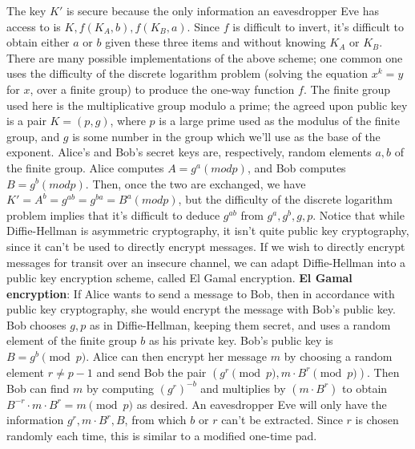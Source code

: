 \documentclass{article}
\begin{document}
\indent The key $ K' $ is secure because the only information an eavesdropper Eve has access to is $ K, f(K_A, b), f(K_B, a) $. Since $ f $ is difficult to invert, it's difficult to obtain either $ a $ or $ b $ given these three items and without knowing $ K_A $ or $ K_B $.
\newline
\indent There are many possible implementations of the above scheme; one common one uses the difficulty of the discrete logarithm problem (solving the equation $ x^k = y $ for $ x $, over a finite group) to produce the one-way function $ f $. The finite group used here is the multiplicative group modulo a prime; the agreed upon public key is a pair $ K = (p, g) $, where $ p $ is a large prime used as the modulus of the finite group, and $ g $ is some number in the group which we'll use as the base of the exponent. Alice's and Bob's secret keys are, respectively, random elements $ a, b $ of the finite group. Alice computes $ A = g^a (mod p) $, and Bob computes $ B = g^b (mod p) $. Then, once the two are exchanged, we have $ K' = A^b = g^{a b} = g^{b a} = B^a (mod p) $, but the difficulty of the discrete logarithm problem implies that it's difficult to deduce $ g^{a b} $ from $ g^a, g^b, g, p $.
\newline \newline
Notice that while Diffie-Hellman is asymmetric cryptography, it isn't quite public key cryptography, since it can't be used to directly encrypt messages. If we wish to directly encrypt messages for transit over an insecure channel, we can adapt Diffie-Hellman into a public key encryption scheme, called El Gamal encryption.
\newline \newline
\textbf{El Gamal encryption}: If Alice wants to send a message to Bob, then in accordance with public key cryptography, she would encrypt the message with Bob's public key. Bob chooses $ g, p $ as in Diffie-Hellman, keeping them secret, and uses a random element of the finite group $ b $ as his private key. Bob's public key is $ B = g^b \pmod p $. Alice can then encrypt her message $ m $ by choosing a random element $ r \neq p - 1 $ and send Bob the pair $ (g^r \pmod p, m \cdot B^r \pmod p) $. Then Bob can find $ m $ by computing $ (g^r)^{-b} $ and multiplies by $ (m \cdot B^r) $ to obtain $ B^{-r} \cdot m \cdot B^r = m \pmod p $ as desired. An eavesdropper Eve will only have the information $ g^r, m \cdot B^r, B $, from which $ b $ or $ r $ can't be extracted.
\newline
\indent Since $ r $ is chosen randomly each time, this is similar to a modified one-time pad.
\end{document}
